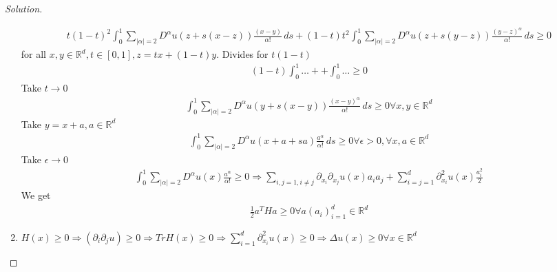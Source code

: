 \documentclass{report}
\theoremstyle{tommy}
\begin{document}
\begin{proof}[Solution]
\begin{enumerate}[label=\alph*)]
      \begin{align*}
        t(1-t)^2 \int_0^1 \sum_{|\alpha| = 2} D^\alpha u(z + s(x-z)) \frac{(x-y)}{\alpha!} \, ds + (1-t) t^2 \int_0^1 \sum_{|\alpha| = 2} D^\alpha u(z + s(y-z)) \frac{(y-z)^\alpha}{\alpha!} \,ds \ge 0
      \end{align*}
      for all \(x,y \in \mathbb{R}^d, t \in [0,1], z = tx+ (1-t)y\). Divides for \(t(1-t)\)
      \begin{align*}
        (1-t) \int_0^1 \dots + + \int_0^1 \dots \ge 0
      \end{align*}
      Take \(t \to 0\)
      \begin{align*}
        \int_0^1 \sum_{|\alpha| = 2} D^\alpha u(y + s(x-y)) \frac{(x-y)^\alpha}{\alpha!} \, ds \ge 0 \forall x,y \in \mathbb{R}^d
      \end{align*}
      Take \(y = x +a, a \in \mathbb{R}^d\)
      \begin{align*}
        \int_0^1 \sum_{|\alpha| = 2} D^\alpha u(x +a+sa) \frac{a^\alpha}{\alpha!} \, ds \ge 0 \forall \epsilon > 0, \forall x,a \in \mathbb{R}^d
      \end{align*}
      Take \(\epsilon \to 0\)
      \begin{align*}
        \int_0^1 \sum_{|\alpha| = 2} D^\alpha u(x) \frac{a^\alpha}{\alpha!} \ge 0 \Rightarrow \sum_{i,j = 1, i \ne j}\partial_{x_i} \partial_{x_j} u(x) a_i a_j + \sum_{i=j=1}^d \partial_{x_i}^2 u(x) \frac{a_i^2}{2}
      \end{align*}
      We get
      \begin{align*}
        \frac{1}{2} a^T Ha \ge 0 \forall a(a_i)_{i=1}^d \in \mathbb{R}^d
      \end{align*}
      \item \(H(x) \ge 0 \Rightarrow \left(\partial_i \partial_j u\right) \ge 0 \Rightarrow Tr H(x) \ge 0 \Rightarrow \sum_{i=1}^d \partial_{x_i}^2 u(x) \ge 0 \Rightarrow \Delta u(x) \ge 0 \forall x \in \mathbb{R}^d\)
    \end{enumerate}
  \end{proof}
\end{document}
